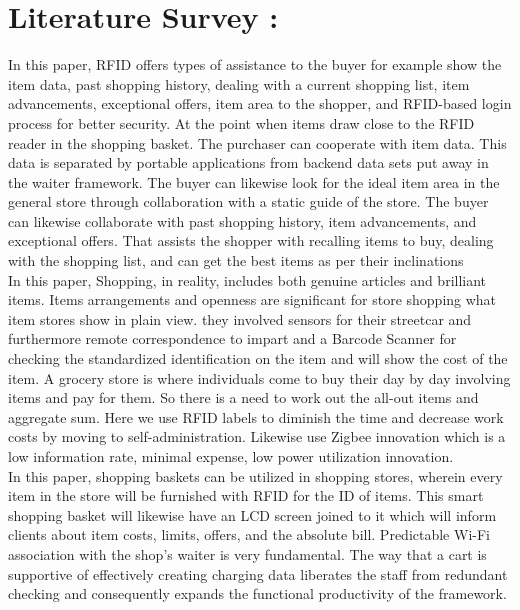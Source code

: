 \documentclass[conference]{IEEEtran}
\begin{document}
\section{Literature Survey :}
In this paper\cite{b1}, RFID offers types of assistance to the buyer for example show the item data, past shopping history, dealing with a current shopping list, item advancements, exceptional offers, item area to the shopper, and RFID-based login process for better security. At the point when items draw close to the RFID reader in the shopping basket. The purchaser can cooperate with item data. This data is separated by portable applications from backend data sets put away in the waiter framework. The buyer can likewise look for the ideal item area in the general store through collaboration with a static guide of the store. The buyer can likewise collaborate with past shopping history, item advancements, and exceptional offers. That assists the shopper with recalling items to buy, dealing with the shopping list, and can get the best items as per their inclinations\\

In this paper\cite{b2}, Shopping, in reality, includes both genuine articles and brilliant items. Items arrangements and openness are significant for store shopping what item stores show in plain view. they involved sensors for their streetcar and furthermore remote correspondence to impart and a Barcode Scanner for checking the standardized identification on the item and will show the cost of the item.
A grocery store is where individuals come to buy their day by day involving items and pay for them. So there is a need to work out the all-out items and aggregate sum. Here we use RFID labels to diminish the time and decrease work costs by moving to self-administration. Likewise use Zigbee innovation which is a low information rate, minimal expense, low power utilization innovation.\\

In this paper\cite{b3}, shopping baskets can be utilized in shopping stores, wherein every item in the store will be furnished with RFID for the ID of items. This smart shopping basket will likewise have an LCD screen joined to it which will inform clients about item costs, limits, offers, and the absolute bill. Predictable Wi-Fi association with the shop's waiter is very fundamental. The way that a cart is supportive of effectively creating charging data liberates the staff from redundant checking and consequently expands the functional productivity of the framework.\\
\end{document}
